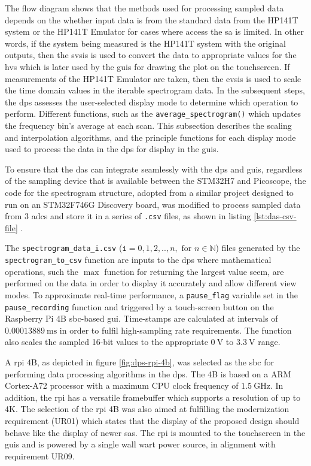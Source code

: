 \documentclass[class=report,11pt,crop=false]{standalone}
\begin{document}
	The flow diagram shows that the methods used for processing sampled data depends on the whether input data is from the standard data from the HP141T system or the HP141T Emulator for cases where access the \acrshort{sa} is limited. In other words, if the system being measured is the HP141T system with the original outputs, then the \acrfull{svsis} is used to convert the data to appropriate values for the \acrfull{hvs} which is later used by the \acrshort{guis} for drawing the plot on the touchscreen. If measurements of the HP141T Emulator are taken, then the \acrfull{evsis} is used to scale the time domain values in the iterable spectrogram data. In the subsequent steps, the \acrshort{dps} assesses the user-selected display mode to determine which operation to perform. Different functions, such as the \texttt{average\_spectrogram()} which updates the frequency bin's average at each scan. This subsection describes the scaling and interpolation algorithms, and the principle functions for each display mode used to process the data in the \acrshort{dps} for display in the \acrshort{guis}.
	
	To ensure that the \acrshort{das} can integrate seamlessly with the \acrfull{dps} and \acrfull{guis}, regardless of the sampling device that is available between the STM32H7 and Picoscope, the code for the spectrogram structure, adopted from a similar project designed to run on an STM32F746G Discovery board, was modified to process sampled data from 3 \acrshort{adc}s and store it in a series of \texttt{.csv} files, as shown in listing \ref{lst:das-csv-file} \cite{sebgithub2024}. 

	The \texttt{spectrogram\_data\_i.csv} ($\texttt{i}=0,1,2,..,n, \text{ for }n \in \mathbb{N}$) files generated by the \texttt{spectrogram\_to\_csv} function are inputs to the \acrshort{dps} where mathematical operations, such the $\max$ function for returning the largest value seem, are performed on the data in order to display it accurately and allow different view modes. To approximate real-time performance, a \texttt{pause\_flag} variable set in the \texttt{pause\_recording} function and triggered by a touch-screen button on the Raspberry Pi 4B \acrshort{sbc}-based \acrshort{gui}. Time-stamps are calculated at intervals of $\SI{0.00013889}{\milli\second}$ in order to fulfil high-sampling rate requirements. The function also scales the sampled 16-bit values to the appropriate $\SI{0}{\volt}$ to $\SI{3.3}{\volt}$ range. 

	A \acrfull{rpi} 4B, as depicted in figure \ref{fig:dps-rpi-4b}, was selected as the \acrshort{sbc} for performing data processing algorithms in the \acrshort{dps}. The 4B is based on a ARM Cortex-A72 processor with a maximum CPU clock frequency of $\SI{1.5}{\giga\hertz}$. In addition, the \acrshort{rpi} has a versatile framebuffer which supports a resolution of up to 4K. The selection of the \acrshort{rpi} 4B was also aimed at fulfilling the modernization requirement (UR01) which states that the display of the proposed design should behave like the display of newer \acrshort{sa}s. The \acrshort{rpi} is mounted to the touchscreen in the \acrshort{guis} and is powered by a single wall wart power source, in alignment with requirement UR09. 
	
\end{document}
